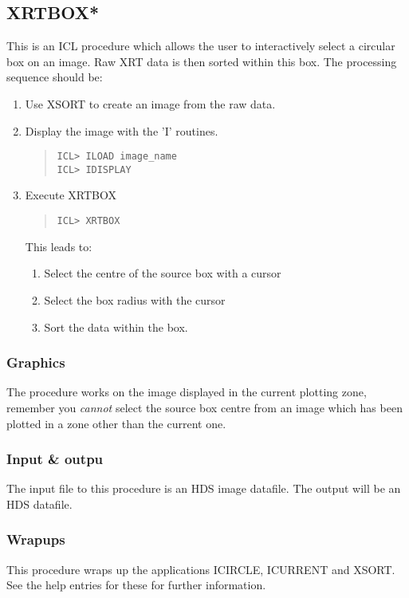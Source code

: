 \documentclass{book}
\renewcommand{\_}{{\tt\char'137}}     %
\begin{document}
\subsection{XRTBOX*}
This is an ICL procedure which allows the user to interactively select
a circular box on an image. Raw XRT data is then sorted within this
box. The processing sequence should be:

\begin{enumerate}
\item Use XSORT to create an image from the raw data.
\item Display the image with the 'I' routines.
\begin{quote}\begin{verbatim}
ICL> ILOAD image_name
ICL> IDISPLAY
\end{verbatim}\end{quote}
\item Execute XRTBOX
\begin{quote}\begin{verbatim}
ICL> XRTBOX
\end{verbatim}\end{quote}
This leads to:

\begin{enumerate}
\item Select the centre of the source box with a cursor
\item Select the box radius with the cursor
\item Sort the data within the box.
\end{enumerate}
\end{enumerate}
\subsubsection{Graphics}
The procedure works on the image displayed in the current plotting zone,
remember you {\em cannot} select the source box centre from an image which
has been plotted in a zone other than the current one.

\subsubsection{Input \& outpu}
The input file to this procedure is an HDS image datafile. The output
will be an HDS datafile.

\subsubsection{Wrapups}
This procedure wraps up the applications ICIRCLE, ICURRENT and XSORT. See
the help entries for these for further information.
\end{document}
